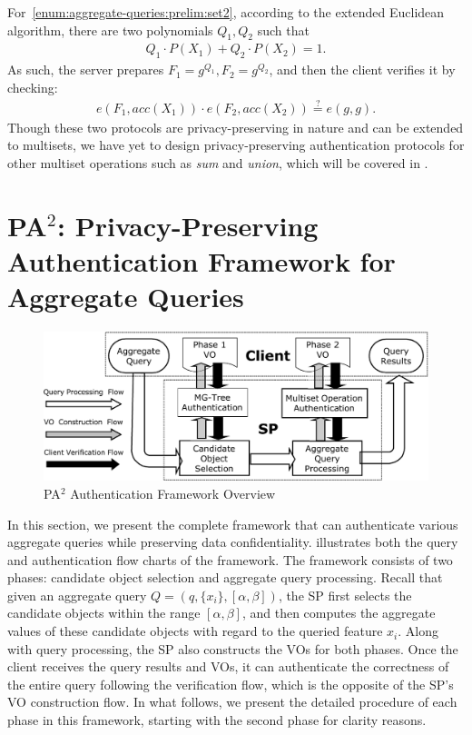 For~\ref{enum:aggregate-queries:prelim:set2}, according to the extended Euclidean algorithm, there are two polynomials $Q_1, Q_2$ such that
\begin{align*}
  Q_1 \cdot P(X_1) + Q_2 \cdot P(X_2) = 1.
\end{align*}
As such, the server prepares $F_1 = g^{Q_1}, F_2 = g^{Q_2}$, and then the client verifies it by checking:
\begin{align*}
  e(F_1, acc(X_1)) \cdot e(F_2, acc(X_2)) \stackrel{?}{=} e(g,g).
\end{align*}
Though these two protocols are privacy-preserving in nature and can be extended to multisets, we have yet to design privacy-preserving authentication protocols for other multiset operations such as \emph{sum} and \emph{union}, which will be covered in .

\section{PA$^2$: Privacy-Preserving Authentication Framework for Aggregate Queries}\label{sec:aggregate-queries:pa2}

\begin{figure}[t]
  \centering
  \includegraphics[width=.8\linewidth]{figs/aggregate-queries/overview.pdf}
  \caption{PA$^2$ Authentication Framework Overview}\label{fig:aggregate-queries:overview}
\end{figure}

In this section, we present the complete framework that can authenticate various aggregate queries while preserving data confidentiality.  illustrates both the query and authentication flow charts of the framework. The framework consists of two phases: candidate object selection and aggregate query processing. Recall that given an aggregate query $Q = (q, \{x_i\}, [\alpha, \beta])$, the SP first selects the candidate objects within the range $[\alpha, \beta]$, and then computes the aggregate values of these candidate objects with regard to the queried feature $x_i$. Along with query processing, the SP also constructs the VOs for both phases. Once the client receives the query results and VOs, it can authenticate the correctness of the entire query following the verification flow, which is the opposite of the SP's VO construction flow. In what follows, we present the detailed procedure of each phase in this framework, starting with the second phase for clarity reasons.

